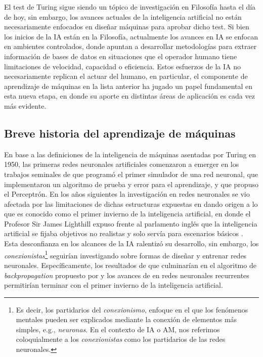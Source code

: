 El test de Turing sigue siendo un tópico de investigación en Filosofía hasta el día de hoy, sin embargo, los avances actuales de la inteligencia artificial no están necesariamente enfocados en diseñar máquinas para aprobar dicho test. Si bien los inicios de la IA están en la Filosofía, actualmente los avances en IA se enfocan en ambientes controlados, donde apuntan a desarrollar metodologías para extraer información de bases de datos en situaciones que el operador humano tiene limitaciones de velocidad, capacidad o eficiencia. Estos esfuerzos de la IA no necesariamente replican el actuar del humano, en particular, el componente de aprendizaje de máquinas en la lista anterior ha jugado un papel fundamental en esta nueva etapa, en donde su aporte en distintas áreas de aplicación es cada vez más evidente. 


\subsection{Breve historia del aprendizaje de máquinas}

En base a las definiciones de la inteligencia de máquinas asentadas por Turing en 1950, las primeras redes neuronales artificiales comenzaron a emerger en los trabajos seminales de \cite{minsky_1952} que programó el primer simulador de una red neuronal, \cite{farley_1954} que implementaron un algoritmo de prueba y error para el aprendizaje, y \cite{rosenblatt_1958} que propuso el Perceptrón. En los años siguientes la investigación en redes neuronales se vio afectada por las limitaciones de dichas estructuras expuestas en \cite{minsky_papert_1969} dando origen a lo que es conocido como el primer invierno de la inteligencia artificial, en donde el Profesor Sir James Lighthill expuso frente al parlamento inglés que la inteligencia artificial se fijaba objetivos no realistas y solo servía para escenarios básicos \cite{lighthill_1973}. Esta desconfianza en los alcances de la IA ralentizó su desarrollo, sin embargo, los \emph{conexionistas}\footnote{Es decir, los partidarios del \emph{conexionismo}, enfoque en el que los fenómenos mentales pueden ser explicados mediante la  conexión de elementos más simples, e.g., \emph{neuronas}. En el contexto de IA o AM, nos referimos coloquialmente a los \emph{conexionistas} como los partidarios de las redes neuronales.}  seguirían investigando sobre formas de diseñar y entrenar redes neuronales. Específicamente, los resultados de \cite{werbos_1974} que culminarían en el algoritmo de \emph{backpropagation} propuesto por \cite{rumelhart_1986} y los avances de  \cite{hopfield_1982} en redes neuronales recurrentes permitirían terminar con el primer invierno de la inteligencia artificial.  
 
